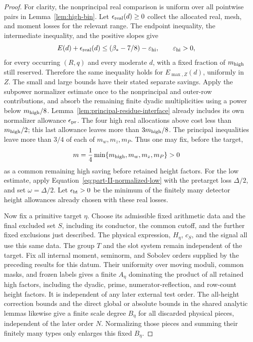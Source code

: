 \documentclass[11pt,a4paper]{article}
\numberwithin{equation}{section}
\numberwithin{figure}{section}
\theoremstyle{definition}
\theoremstyle{remark}
\begin{document}
\begin{proof}
For clarity, the nonprincipal real comparison is uniform over all
pointwise pairs in Lemma~\ref{lem:high-bin}.  Let
\(\epsilon_{\rm real}(d)\ge0\) collect the allocated real, mesh, and
moment losses for the relevant range.  The endpoint inequality,
the intermediate inequality, and the positive slopes give
\begin{equation}\label{eq:saving-criterion}
 E(d)+\epsilon_{\rm real}(d)
 \le(\beta_*-7/8)-\varepsilon_{\rm hi},
 \qquad \varepsilon_{\rm hi}>0,
\end{equation}
for every occurring \((R,q)\) and every moderate \(d\), with a fixed
fraction of \(m_{\rm high}\) still reserved.  Therefore the same
inequality holds for \(E_{\max,Z}(d)\), uniformly in \(Z\).
The small and large bounds have their stated separate savings.
Apply the subpower normalizer estimate once to the nonprincipal and
outer-row contributions, and absorb the remaining finite dyadic
multiplicities using a power below \(m_{\rm high}/8\).
Lemma~\ref{lem:principal-residue-interface} already includes its own normalizer allowance
\(\epsilon_{\rm pr}\).  The four high real allocations above cost less
than \(m_{\rm high}/2\); this last allowance leaves more than
\(3m_{\rm high}/8\).  The principal inequalities leave more than
\(3/4\) of each of \(m_w,m_z,m_P\).  Thus one may fix, before the target,
\[
 m=\frac14\min\{m_{\rm high},m_w,m_z,m_P\}>0
\]
as a common remaining high saving before retained height factors.
For the low estimate, apply Equation~\eqref{eq:part-II-normalized-low}
with the pretarget loss \(\Delta/2\), and set \(\omega=\Delta/2\).
Let \(\epsilon_{\rm ht}>0\) be the minimum of the finitely many detector
height allowances already chosen with these real losses.

Now fix a primitive target \(\eta\).  Choose its admissible fixed
arithmetic data and the final excluded set \(S\), including its conductor,
the common cutoff, and the further fixed exclusions just described.
The physical expression, \(H_\eta\), \(c_S\), and the signal all use this
same data.  The group \(T\) and the slot system remain independent of
the target.  Fix all internal moment, seminorm, and Sobolev orders
supplied by the preceding results for this datum.  Their uniformity over
moving moduli, common masks, and frozen labels gives a finite
\(A_\eta\) dominating the product of all retained high factors, including
the dyadic, prime, numerator-reflection, and row-count height factors.
It is independent of any later external test order.  The all-height
correction bounds and the direct global or absolute bounds in the shared
analytic lemmas likewise give a finite scale degree \(B_\eta\) for all
discarded physical pieces, independent of the later order \(N\).
Normalizing those pieces and summing their finitely many types only
enlarges this fixed \(B_\eta\).


\end{proof}
\end{document}
